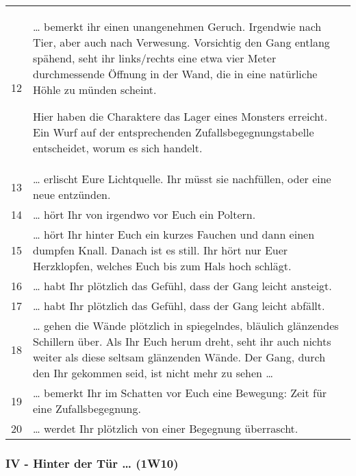 \begin{tabularx}{\columnwidth}{cZ}
12 & 
  \ldots{} bemerkt ihr einen unangenehmen Geruch. Irgendwie nach Tier,
  aber auch nach Verwesung. Vorsichtig den Gang entlang spähend, seht
  ihr links/rechts eine etwa vier Meter durchmessende Öffnung in der
  Wand, die in eine natürliche Höhle zu münden scheint.

  Hier haben die Charaktere das Lager eines Monsters erreicht. Ein Wurf
  auf der entsprechenden Zufallsbegegnungstabelle entscheidet, worum es
  sich handelt.
\\
13 & 
  \ldots{} erlischt Eure Lichtquelle. Ihr müsst sie nachfüllen, oder
  eine neue entzünden.
\\
14 & 
  \ldots{} hört Ihr von irgendwo vor Euch ein Poltern.
\\
15 & 
  \ldots{} hört Ihr hinter Euch ein kurzes Fauchen und dann einen
  dumpfen Knall. Danach ist es still. Ihr hört nur Euer Herzklopfen,
  welches Euch bis zum Hals hoch schlägt.
\\
16 & 
  \ldots{} habt Ihr plötzlich das Gefühl, dass der Gang leicht ansteigt.
\\
17 & 
  \ldots{} habt Ihr plötzlich das Gefühl, dass der Gang leicht abfällt.
\\
18 & 
  \ldots{} gehen die Wände plötzlich in spiegelndes, bläulich glänzendes
  Schillern über. Als Ihr Euch herum dreht, seht ihr auch nichts weiter
  als diese seltsam glänzenden Wände. Der Gang, durch den Ihr gekommen
  seid, ist nicht mehr zu sehen \ldots{}
\\
19 & 
  \ldots{} bemerkt Ihr im Schatten vor Euch eine Bewegung: Zeit für eine
  Zufallsbegegnung.
\\
20 & \ldots{} werdet Ihr plötzlich von einer Begegnung überrascht.
\end{tabularx}

\subsubsection{IV - Hinter der Tür \ldots{} (1W10)}

